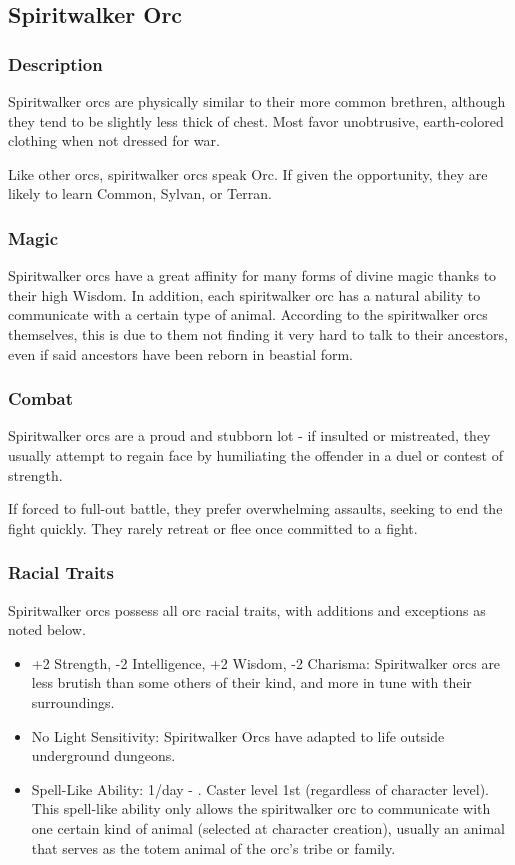 \subsection{Spiritwalker Orc}
\subsubsection{Description}
Spiritwalker orcs are physically similar to their more common brethren, although they tend to be slightly less thick of chest. Most favor unobtrusive, earth-colored clothing when not dressed for war. %

Like other orcs, spiritwalker orcs speak Orc. If given the opportunity, they are likely to learn Common, Sylvan, or Terran.
\subsubsection{Magic}
Spiritwalker orcs have a great affinity for many forms of divine magic thanks to their high Wisdom. In addition, each spiritwalker orc has a natural ability to communicate with a certain type of animal. According to the spiritwalker orcs themselves, this is due to them not finding it very hard to talk to their ancestors, even if said ancestors have been reborn in beastial form.
\subsubsection{Combat}
Spiritwalker orcs are a proud and stubborn lot - if insulted or mistreated, they usually attempt to regain face by humiliating the offender in a duel or contest of strength. 

If forced to full-out battle, they prefer overwhelming assaults, seeking to end the fight quickly. They rarely retreat or flee once committed to a fight.
\subsubsection{Racial Traits}
Spiritwalker orcs possess all orc racial traits, with additions and exceptions as noted below.
\begin{itemize}
 \item +2 Strength, -2 Intelligence, +2 Wisdom, -2 Charisma: Spiritwalker orcs are less brutish than some others of their kind, and more in tune with their surroundings.
 \item No Light Sensitivity: Spiritwalker Orcs have adapted to life outside underground dungeons.
 \item Spell-Like Ability: 1/day - . Caster level 1st (regardless of character level). This spell-like ability only allows the spiritwalker orc to communicate with one certain kind of animal (selected at character creation), usually an animal that serves as the totem animal of the orc's tribe or family.
\end{itemize}